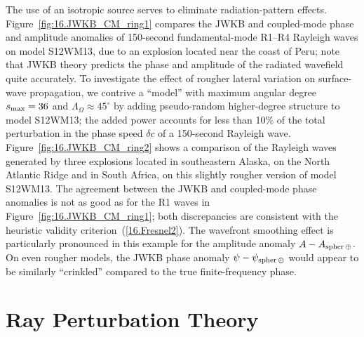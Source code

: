 The use of an isotropic source serves to eliminate radiation-pattern
effects.   Figure~\ref{fig:16.JWKB_CM_ring1} compares the JWKB and
coupled-mode phase and amplitude anomalies of 150-second
fundamental-mode R1--R4 Rayleigh waves on model S12WM13,
due to an explosion located near the coast of Peru; note
that JWKB theory predicts the phase and amplitude of the
radiated wavefield quite accurately.
To investigate the
effect of rougher lateral variation on surface-wave propagation,
we contrive a ``model'' with maximum angular degree
$s_{\rm max}=36$  and $\Lambda_{\Omega}\approx 45^{\circ}$ by
adding pseudo-random higher-degree structure to model S12WM13;
the added power accounts for less than 10\% of the total
perturbation in the phase speed $\delta c$ of a 150-second
Rayleigh wave. Figure~\ref{fig:16.JWKB_CM_ring2} shows a
comparison of the Rayleigh waves generated by three explosions
located in southeastern Alaska, on the North Atlantic
Ridge and in South Africa, on this slightly rougher
version of model S12WM13.  The agreement between the
JWKB and coupled-mode phase anomalies is not as good
as for the R1 waves in Figure~\ref{fig:16.JWKB_CM_ring1};
both discrepancies are consistent with the heuristic validity
criterion~(\ref{16.Fresnel2}).  The wavefront smoothing
effect is particularly pronounced in this example for the
amplitude anomaly $A-A_{\rm spher\,\oplus}$.  On even rougher models,
the JWKB phase anomaly $\psi-\psi_{\rm spher\,\oplus}$ would appear to be
similarly ``crinkled'' compared to the true finite-frequency phase.
%

\section{Ray Perturbation Theory}
%
%
%
\label{16.sec.raypert}

